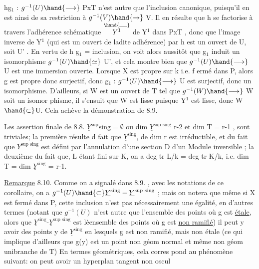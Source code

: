

hg$_1$ :  $g^{-1}(U) \hand{\longrightarrow}$ PxT  n'est autre que l'inclusion canonique, puisqu'il
en est ainsi de sa restriction à $g^{-1}(V) \hand{\rightarrow}$ V.  
 Il en résulte que h  se factorise
à travers l'adhérence schématique  $\overset{\hand{\rule{1.1em}{0.35pt}}}{Y^1}$ de Y$^1$ dans  PxT , donc que
l'image inverse de Y$^1$ (qui est un ouvert de ladite adhérence) par h
est un ouvert de U, soit U' . En vertu de  h g$_1$ = inclusion, on
voit alors aussitôt que  g$_1$ induit un isomorphisme  $g^{-1}(U) \hand{\simeq}$ U', et
 cela montre bien que  $g^{-1}(U) \hand{\longrightarrow}$ U est une immersion ouverte.
Lorsque X est propre sur k i.e. f ermé dans P, alors  g est propre donc
surjectif, donc  g$_1$ : $g^{-1}(U) \hand{\longrightarrow}$ U est surjectif, donc un isomorphisme.
D'ailleurs, si  W est un ouvert de T tel que  $g^{-1}(W) \hand{\longrightarrow}$ W soit un isomor%
phisme, il s'ensuit que W est lisse puisque Y$^1$ est lisse, donc W$\hand{\subset}$U.
Cela achève la démonstration de 8.9. 

  Les assertion finale de 8.8.\hand{,} $\underline{Y}^{\text{sup}}\text{sing}=\emptyset$ ou dim $\underline{Y}^{\text{sup sing}}$ \unsure{$\leq$} r-2\hand{,} et
dim T = r-1 , sont triviales;  la première résulte d 
  fait que $\underline{Y}^{\text{sing}}$, de dim r  est irréductible, et du fait que
 $\underline{Y}^{\text{sup sing}}$  est défini par l'annulation d'une section D d'un Module inversible ; la deuxième du fait que, L étant fini sur K, on a
deg tr L/k = deg tr K/k, i.e.   dim T = dim $\underline{Y}^{\text{sing}}$ = r-1.

\uline{Remarque} 8.10.  Comme on a signalé dans  8.9. , avec les notations de
ce corollaire, on a  $g^{-1}(U) \hand{\subset} \underline{Y}^{\text{sing}} - \underline{Y}^{\text{sup sing}}$ ; mais on notera que
même si X est fermé dans P,  cette inclusion n'est pas nécessairement
\placedmargin{\hand{\unsure{$\cdot$}}} une égalité, en d'autres termes (notant que $g^{-1}(U)$ n'est autre que
l'ensemble des points où g est \uline{étale}, alors que $\underline{Y}^{\text{sing}}$-$\underline{Y}^{\text{sup sing}}$ est
lèensemble des points où g est \uline{non ramifié}) il peut y avoir des points
y de $\underline{Y}^{\text{sing}}$ en lesquels  g est  non ramifié, mais non étale (ce qui
 implique d'ailleurs que g(y) est un point non  géom normal et même
non géom unibranche de  T)  En termes géométriques, cela corres%
pond au phénomène suivant: on peut avoir un hyperplan tangent non oscul
